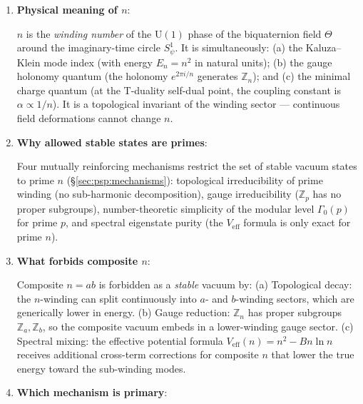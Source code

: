 \documentclass[12pt,a4paper]{article}
\theoremstyle{definition}
\theoremstyle{remark}
\newcommand{\ZZ}{\mathbb{Z}}
\begin{document}
\begin{enumerate}

\item[\textbf{Q1.}] \textbf{Physical meaning of $n$}:

  $n$ is the \emph{winding number} of the $\mathrm{U}(1)$ phase of the
  biquaternion field $\Theta$ around the imaginary-time circle $S^1_\psi$.
  It is simultaneously: (a) the Kaluza--Klein mode index (with energy $E_n = n^2$
  in natural units); (b) the gauge holonomy quantum (the holonomy $e^{2\pi i/n}$
  generates $\ZZ_n$); and (c) the minimal charge quantum (at the T-duality
  self-dual point, the coupling constant is $\alpha \propto 1/n$).
  It is a topological invariant of the winding sector — continuous field
  deformations cannot change $n$.

\item[\textbf{Q2.}] \textbf{Why allowed stable states are primes}:

  Four mutually reinforcing mechanisms restrict the set of stable vacuum
  states to prime $n$ (§\ref{sec:psp:mechanisms}):
  topological irreducibility of prime winding (no sub-harmonic decomposition),
  gauge irreducibility ($\ZZ_p$ has no proper subgroups),
  number-theoretic simplicity of the modular level $\Gamma_0(p)$ for prime $p$,
  and spectral eigenstate purity (the $V_{\mathrm{eff}}$ formula is only exact
  for prime $n$).

\item[\textbf{Q3.}] \textbf{What forbids composite $n$}:

  Composite $n = ab$ is forbidden as a \emph{stable} vacuum by:
  (a) Topological decay: the $n$-winding can split continuously into $a$- and
      $b$-winding sectors, which are generically lower in energy.
  (b) Gauge reduction: $\ZZ_n$ has proper subgroups $\ZZ_a, \ZZ_b$,
      so the composite vacuum embeds in a lower-winding gauge sector.
  (c) Spectral mixing: the effective potential formula $V_{\mathrm{eff}}(n) = n^2 - Bn\ln n$
      receives additional cross-term corrections for composite $n$ that lower the
      true energy toward the sub-winding modes.

\item[\textbf{Q4.}] \textbf{Which mechanism is primary}:


\end{enumerate}
\end{document}

